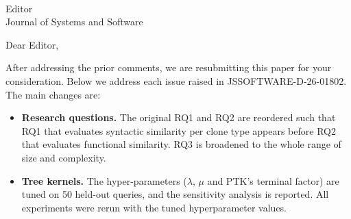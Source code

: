 \documentclass[
pagenumber=false, %
parskip=half, %
fromalign=right, %
foldmarks=false, %
addrfield=false %
]{scrlttr2}
\begin{document}
	

	\makeatletter {}
	
	\begin{letter}{\\Editor\\Journal of Systems and Software}
		
	\opening{Dear Editor,}
		
	
%	
%		

	
	After addressing the prior comments, we are resubmitting this paper for your consideration. Below we
	address each issue raised in JSSOFTWARE-D-26-01802. The main changes are:
	
	\begin{itemize}
		\item \textbf{Research questions.} The original RQ1 and RQ2 are reordered such that RQ1 that evaluates
		syntactic similarity per clone type appears before RQ2 that evaluates functional similarity. RQ3 is broadened to the
		whole range of size and complexity.
		
		\item \textbf{Tree kernels.} The hyper-parameters ($\lambda$, $\mu$ and PTK's terminal factor) are
		tuned on 50 held-out queries, and the sensitivity analysis is reported. All experiments were rerun with the tuned hyperparameter values.
		

\end{itemize}
\end{letter}
\end{document}
